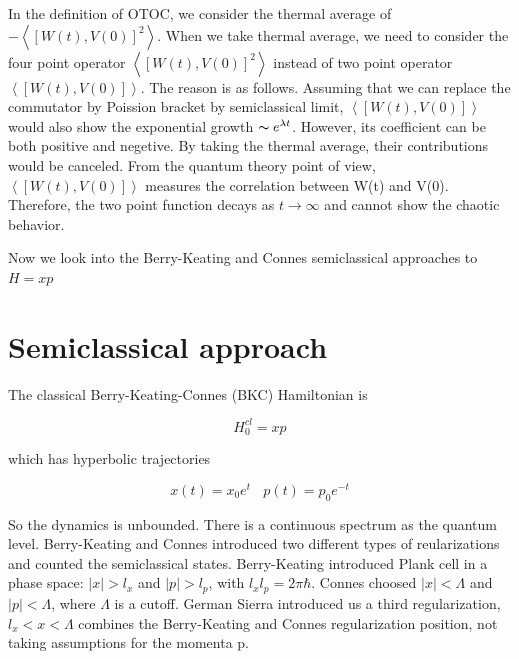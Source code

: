 \documentclass[12pt, letterpaper]{article}
\newcommand*{\1}{\hspace{1pt}}
\begin{document}
\begin{mdframed}[hidealllines=true,backgroundcolor=blue!20]
    In the definition of OTOC, we consider the thermal average of $- \left\langle\left[W(t),V(0)\right]^{2}\right\rangle$. When we take thermal average, we need to 
    consider the four point operator $\left\langle\left[W(t),V(0)\right]^{2}\right\rangle$ instead of two point operator $\left\langle\left[W(t),V(0)\right]\right\rangle$.
    The reason is as follows. Assuming that we can replace the commutator by Poission bracket by semiclassical limit, $\left\langle\left[W(t),V(0)\right]\right\rangle$
    would also show the exponential growth $\thicksim  e^{\lambda t}$. However, its coefficient can be both positive and negetive. By taking the thermal average, their
    contributions would be canceled. From the quantum theory point of view, $\left\langle\left[W(t),V(0)\right]\right\rangle$ measures the correlation between W(t)
    and V(0). Therefore, the two point function decays as $t \rightarrow \infty$ and cannot show the chaotic behavior.

    \end{mdframed}
    Now we look into the Berry-Keating and Connes semiclassical approaches to $H=xp$

    \section{Semiclassical approach}

    The classical Berry-Keating-Connes (BKC) Hamiltonian is\cite{s1,s2}

    \begin{equation}
        H ^{cl} _{0} = xp
    \end{equation}

    which has hyperbolic trajectories 
    
    \begin{equation}
        x(t) = x_{0}e^{t}  \ \ \ \  p(t) = p_{0}e^{-t}
    \end{equation}

    So the dynamics is unbounded. There is a continuous spectrum as the quantum level. Berry-Keating and Connes introduced two different types of reularizations and counted
    the semiclassical states. Berry-Keating introduced Plank cell in a phase space: $|x| > l_{x}$ and $|p| > l_{p}$, with $l_{x}l_{p} = 2 \pi \hbar$. Connes 
    choosed $|x| < \Lambda $ and $|p| < \Lambda$, where $\Lambda$ is a cutoff. German Sierra introduced us a third regularization, $l_{x} < x < \Lambda$ combines
    the Berry-Keating and Connes regularization position, not taking assumptions for the momenta p. \
\end{document}
